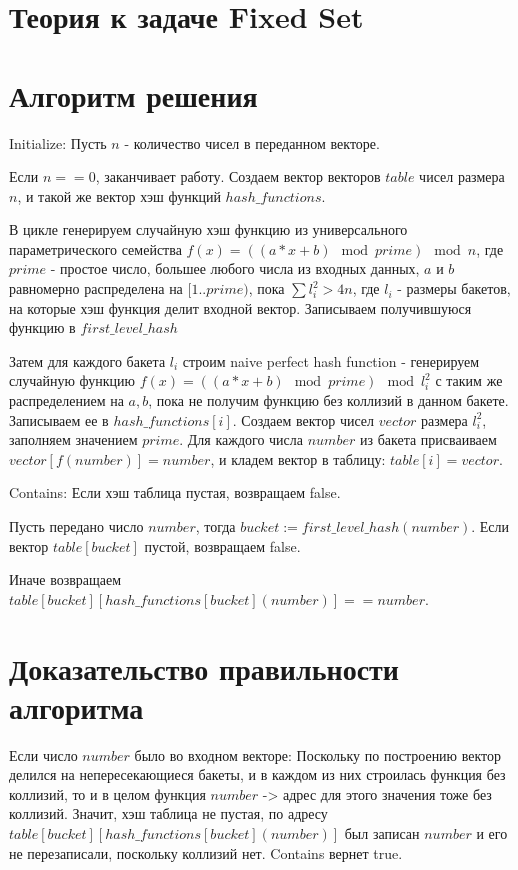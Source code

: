 \documentclass{article}
\begin{document}
\section*{Теория к задаче Fixed Set}
\section{Алгоритм решения}

Initialize:
Пусть $n$ - количество чисел в переданном векторе.

Если $n == 0$, заканчивает работу.
Создаем вектор векторов $table$ чисел размера $n$, и такой же вектор хэш функций $hash\_functions$.

В цикле генерируем случайную хэш функцию из универсального параметрического семейства $f(x) = ((a*x + b) \mod prime) \mod n $, где $prime$ - простое число, большее любого числа из входных данных, $a$ и $b$ равномерно распределена на $[1..prime)$, пока $\sum l_i^2 > 4n$, где $l_i$ - размеры бакетов, на которые хэш функция делит входной вектор. Записываем получившуюся функцию в $first\_level\_hash$

Затем для каждого бакета $l_i$ строим naive perfect hash function - генерируем случайную функцию $f(x) = ((a*x + b) \mod prime) \mod l_i^2 $ с таким же распределением на $a, b$, пока не получим функцию без коллизий в данном бакете. Записываем ее в $hash\_functions[i]$. Создаем вектор чисел $vector$ размера $l_i^2$, заполняем значением $prime$. Для каждого числа $number$ из бакета присваиваем $vector[f(number)] = number$, и кладем вектор в таблицу: $table[i] = vector$.

Contains:
Если хэш таблица пустая, возвращаем false.

Пусть передано число $number$, тогда $bucket := first\_level\_hash(number)$. Если вектор $table[bucket]$ пустой, возвращаем false.

Иначе возвращаем $table[bucket][hash\_functions[bucket](number)] == number$.

\section{Доказательство правильности алгоритма}

Если число $number$ было во входном векторе: Поскольку по построению вектор делился на непересекающиеся бакеты, и в каждом из них строилась функция без коллизий, то и в целом функция $number$ -> адрес для этого значения тоже без коллизий. Значит, хэш таблица не пустая, по адресу $table[bucket][hash\_functions[bucket](number)]$ был записан $number$ и его не перезаписали, поскольку коллизий нет. Contains вернет true.
\end{document}
